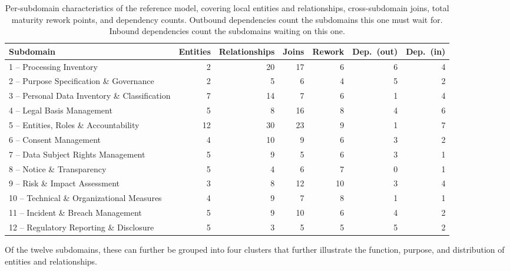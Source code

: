 \documentclass[10pt,letterpaper,twocolumn,twoside]{rho-class/rho}
\begin{document}
\begin{table}[ht]
\centering
\caption{Per-subdomain characteristics of the reference model, covering local entities and relationships, cross-subdomain joins, total maturity rework points, and dependency counts. Outbound dependencies count the subdomains this one must wait for. Inbound dependencies count the subdomains waiting on this one.}
\label{tab:subdomains}
\small
\begin{tabular}{@{}l r r r r r r@{}}
\hline
Subdomain & Entities & Relationships & Joins & Rework & Dep.\ (out) & Dep.\ (in) \\
\hline
1 -- Processing Inventory & 2 & 20 & 17 & 6 & 6 & 4 \\
2 -- Purpose Specification \& Governance & 2 & 5 & 6 & 4 & 5 & 2 \\
3 -- Personal Data Inventory \& Classification & 7 & 14 & 7 & 6 & 1 & 4 \\
4 -- Legal Basis Management & 5 & 8 & 16 & 8 & 4 & 6 \\
5 -- Entities, Roles \& Accountability & 12 & 30 & 23 & 9 & 1 & 7 \\
6 -- Consent Management & 4 & 10 & 9 & 6 & 3 & 2 \\
7 -- Data Subject Rights Management & 5 & 9 & 5 & 6 & 3 & 1 \\
8 -- Notice \& Transparency & 5 & 4 & 6 & 7 & 0 & 1 \\
9 -- Risk \& Impact Assessment & 3 & 8 & 12 & 10 & 3 & 4 \\
10 -- Technical \& Organizational Measures & 4 & 9 & 7 & 8 & 1 & 1 \\
11 -- Incident \& Breach Management & 5 & 9 & 10 & 6 & 4 & 2 \\
12 -- Regulatory Reporting \& Disclosure & 5 & 3 & 5 & 5 & 5 & 2 \\
\hline
\end{tabular}
\end{table}

Of the twelve subdomains, these can further be grouped into four clusters that further illustrate the function, purpose, and distribution of entities and relationships.
\end{document}
